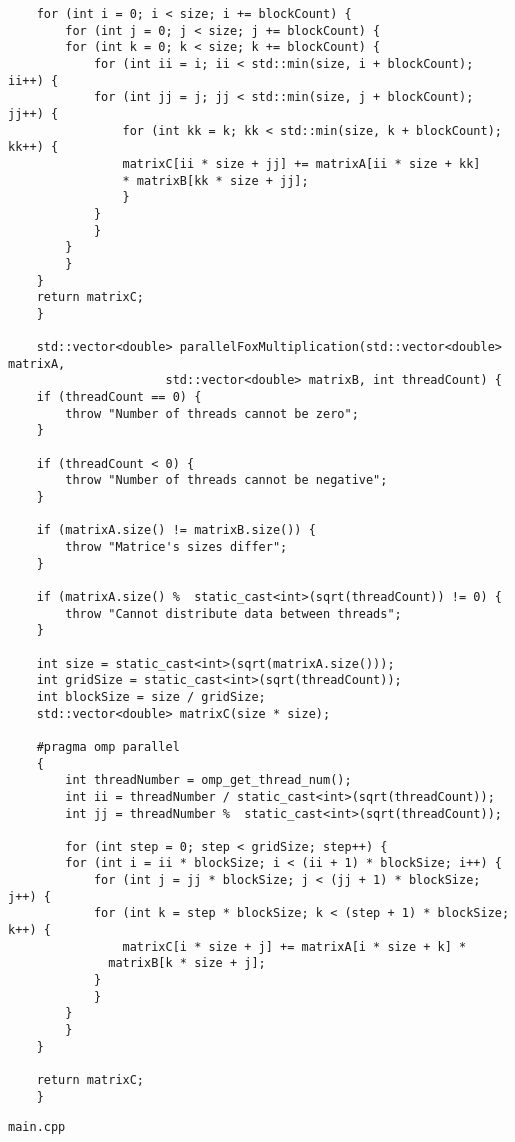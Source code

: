 \documentclass{article}
\begin{document}
\begin{lstlisting}
  	for (int i = 0; i < size; i += blockCount) {
    	for (int j = 0; j < size; j += blockCount) {
      	for (int k = 0; k < size; k += blockCount) {
        	for (int ii = i; ii < std::min(size, i + blockCount); ii++) {
          	for (int jj = j; jj < std::min(size, j + blockCount); jj++) {
            	for (int kk = k; kk < std::min(size, k + blockCount); kk++) {
              	matrixC[ii * size + jj] += matrixA[ii * size + kk]
              	* matrixB[kk * size + jj];
            	}
          	}
        	}
      	}
    	}
  	}
  	return matrixC;
	}

	std::vector<double> parallelFoxMultiplication(std::vector<double> matrixA,
  	                  std::vector<double> matrixB, int threadCount) {
  	if (threadCount == 0) {
    	throw "Number of threads cannot be zero";
  	}

  	if (threadCount < 0) {
    	throw "Number of threads cannot be negative";
  	}

  	if (matrixA.size() != matrixB.size()) {
    	throw "Matrice's sizes differ";
  	}

  	if (matrixA.size() %  static_cast<int>(sqrt(threadCount)) != 0) {
    	throw "Cannot distribute data between threads";
  	}

  	int size = static_cast<int>(sqrt(matrixA.size()));
  	int gridSize = static_cast<int>(sqrt(threadCount));
  	int blockSize = size / gridSize;
  	std::vector<double> matrixC(size * size);

  	#pragma omp parallel
  	{
    	int threadNumber = omp_get_thread_num();
    	int ii = threadNumber / static_cast<int>(sqrt(threadCount));
    	int jj = threadNumber %  static_cast<int>(sqrt(threadCount));

	    for (int step = 0; step < gridSize; step++) {
  	    for (int i = ii * blockSize; i < (ii + 1) * blockSize; i++) {
    	    for (int j = jj * blockSize; j < (jj + 1) * blockSize; j++) {
      	    for (int k = step * blockSize; k < (step + 1) * blockSize; k++) {
        	    matrixC[i * size + j] += matrixA[i * size + k] *
          	  matrixB[k * size + j];
          	}
        	}
      	}
    	}
  	}

  	return matrixC;
	}
\end{lstlisting}
\par
\lstinline$main.cpp$
\end{document}
